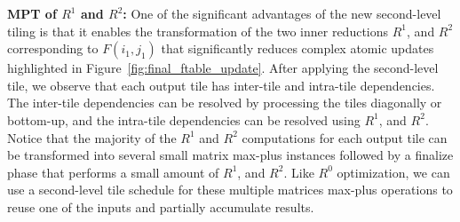 \textbf{\textbf{MPT} of $R^{1}$ and $R^{2}$:}
One of the significant advantages of the new second-level tiling is that it enables the transformation of the two inner reductions $R^{1}$, and $R^{2}$ corresponding to $F(i_{1}, j_{1})$ that significantly reduces complex atomic updates highlighted in Figure~\ref{fig:final_ftable_update}. After applying the second-level tile, we observe that each output tile has inter-tile and intra-tile dependencies. The inter-tile dependencies can be resolved by processing the tiles diagonally or bottom-up, and the intra-tile dependencies can be resolved using $R^{1}$, and $R^{2}$. Notice that the majority of the $R^{1}$ and $R^{2}$ computations for each output tile can be transformed into several small matrix max-plus instances followed by a finalize phase that performs a small amount of $R^{1}$, and $R^{2}$. Like $R^{0}$ optimization, we can use a second-level tile schedule for these multiple matrices max-plus operations to reuse one of the inputs and partially accumulate results. 
